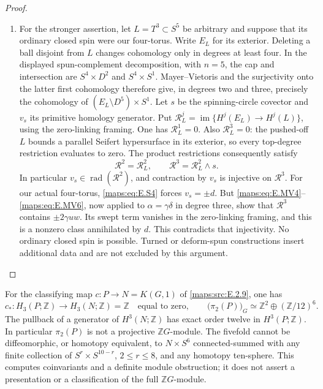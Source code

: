 \begin{proof}
\begin{enumerate}[label=\arabic*.,leftmargin=*]
\item For the stronger assertion, let $L=T^3\subset S^5$ be arbitrary
and suppose that its ordinary closed spin were our four-torus.
Write $E_L$ for its exterior. Deleting a ball disjoint from
$L$ changes cohomology only in degrees at least four. In the
displayed spun-complement decomposition, with $n=5$, the cap
and intersection are $S^4\times D^2$ and $S^4\times S^1$.
Mayer--Vietoris and the surjectivity onto the latter first
cohomology therefore give, in degrees two and three, precisely
the cohomology of $(E_L\setminus D^5)\times S^1$.
Let $s$ be the spinning-circle covector and $v_s$ its primitive
homology generator. Put $\mathcal R_L^j=\operatorname{im}
\{H^j(E_L)\to H^j(L)\}$, using the zero-linking framing.
One has $\mathcal R_L^1=0$. Also $\mathcal R_L^3=0$:
the pushed-off $L$ bounds a parallel Seifert hypersurface in
its exterior, so every top-degree restriction evaluates to
zero. The product restrictions consequently satisfy
\[
       \mathcal R^2=\mathcal R_L^2,\qquad
       \mathcal R^3=\mathcal R_L^2\wedge s.
 \tag{E.S12}\label{maps:eq:E.S12}
\]
In particular $v_s\in\operatorname{rad}(\mathcal R^2)$,
and contraction by $v_s$ is injective on $\mathcal R^3$.
For our actual four-torus, \eqref{maps:eq:E.S4} forces $v_s=\pm d$.
But \eqref{maps:eq:E.MV4}--\eqref{maps:eq:E.MV6}, now applied to $\alpha=\gamma\delta$
in degree three, show that $\mathcal R^3$ contains
$\pm2\gamma uw$. Its swept term vanishes in the zero-linking
framing, and this is a nonzero class annihilated by $d$.
This contradicts that injectivity. No ordinary closed spin
is possible. Turned or deform-spun constructions insert
additional data and are not excluded by this argument.
\end{enumerate}
\end{proof}

\begin{theorem}\label{maps:src:E.2.11}


For the classifying map $c:P\to N=K(G,1)$ of \ref{maps:src:E.2.9}, one has
\[
 c_*:H_3(P;\mathbb Z)\longrightarrow H_3(N;\mathbb Z)=\mathbb Z
       \quad\text{equal to zero},
 \qquad
 \bigl(\pi_2(P)\bigr)_G
       \simeq\mathbb Z^2\oplus(\mathbb Z/12)^6.
 \tag{E.S6}\label{maps:eq:E.S6}
\]
The pullback of a generator of $H^3(N;\mathbb Z)$ has exact order
twelve in $H^3(P;\mathbb Z)$. In particular $\pi_2(P)$ is not a
projective $\mathbb ZG$-module. The fivefold cannot be diffeomorphic,
or homotopy equivalent, to $N\times S^6$ connected-summed with any
finite collection of $S^r\times S^{10-r}$, $2\leq r\leq8$, and
any homotopy ten-sphere. This computes coinvariants and a definite
module obstruction; it does not assert a presentation or a
classification of the full $\mathbb ZG$-module.

\end{theorem}


